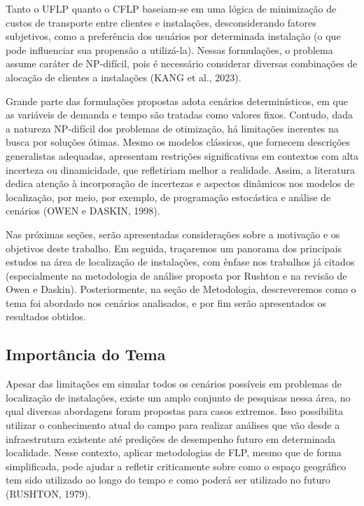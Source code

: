 \documentclass[12pt]{article}
\begin{document}
Tanto o UFLP quanto o CFLP baseiam-se em uma lógica de minimização de custos de transporte entre clientes e instalações, desconsiderando fatores subjetivos, como a preferência dos usuários por determinada instalação (o que pode influenciar sua propensão a utilizá-la). Nessas formulações, o problema assume caráter de NP-difícil, pois é necessário considerar diversas combinações de alocação de clientes a instalações (KANG et al., 2023).

Grande parte das formulações propostas adota cenários determinísticos, em que as variáveis de demanda e tempo são tratadas como valores fixos. Contudo, dada a natureza NP-difícil dos problemas de otimização, há limitações inerentes na busca por soluções ótimas. Mesmo os modelos clássicos, que fornecem descrições generalistas adequadas, apresentam restrições significativas em contextos com alta incerteza ou dinamicidade, que refletiriam melhor a realidade. Assim, a literatura dedica atenção à incorporação de incertezas e aspectos dinâmicos nos modelos de localização, por meio, por exemplo, de programação estocástica e análise de cenários (OWEN e DASKIN, 1998).

Nas próximas seções, serão apresentadas considerações sobre a motivação e os objetivos deste trabalho. Em seguida, traçaremos um panorama dos principais estudos na área de localização de instalações, com ênfase nos trabalhos já citados (especialmente na metodologia de análise proposta por Rushton e na revisão de Owen e Daskin). Posteriormente, na seção de Metodologia, descreveremos como o tema foi abordado nos cenários analisados, e por fim serão apresentados os resultados obtidos.

\subsection{Importância do Tema}

Apesar das limitações em simular todos os cenários possíveis em problemas de localização de instalações, existe um amplo conjunto de pesquisas nessa área, no qual diversas abordagens foram propostas para casos extremos. Isso possibilita utilizar o conhecimento atual do campo para realizar análises que vão desde a infraestrutura existente até predições de desempenho futuro em determinada localidade. Nesse contexto, aplicar metodologias de FLP, mesmo que de forma simplificada, pode ajudar a refletir criticamente sobre como o espaço geográfico tem sido utilizado ao longo do tempo e como poderá ser utilizado no futuro (RUSHTON, 1979).
\end{document}
